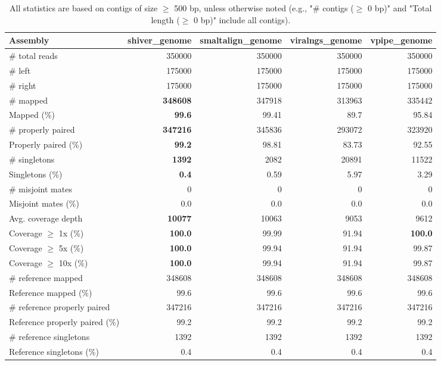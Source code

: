 \documentclass[12pt,a4paper]{article}
\begin{document}
\begin{table}[ht]
\begin{center}
\caption{All statistics are based on contigs of size $\geq$ 500 bp, unless otherwise noted (e.g., "\# contigs ($\geq$ 0 bp)" and "Total length ($\geq$ 0 bp)" include all contigs).}
\begin{tabular}{|l*{4}{|r}|}
\hline
Assembly & shiver\_genome & smaltalign\_genome & viralngs\_genome & vpipe\_genome \\ \hline
\# total reads & 350000 & 350000 & 350000 & 350000 \\ \hline
\# left & 175000 & 175000 & 175000 & 175000 \\ \hline
\# right & 175000 & 175000 & 175000 & 175000 \\ \hline
\# mapped & {\bf 348608} & 347918 & 313963 & 335442 \\ \hline
Mapped (\%) & {\bf 99.6} & 99.41 & 89.7 & 95.84 \\ \hline
\# properly paired & {\bf 347216} & 345836 & 293072 & 323920 \\ \hline
Properly paired (\%) & {\bf 99.2} & 98.81 & 83.73 & 92.55 \\ \hline
\# singletons & {\bf 1392} & 2082 & 20891 & 11522 \\ \hline
Singletons (\%) & {\bf 0.4} & 0.59 & 5.97 & 3.29 \\ \hline
\# misjoint mates & 0 & 0 & 0 & 0 \\ \hline
Misjoint mates (\%) & 0.0 & 0.0 & 0.0 & 0.0 \\ \hline
Avg. coverage depth & {\bf 10077} & 10063 & 9053 & 9612 \\ \hline
Coverage $\geq$ 1x (\%) & {\bf 100.0} & 99.99 & 91.94 & {\bf 100.0} \\ \hline
Coverage $\geq$ 5x (\%) & {\bf 100.0} & 99.94 & 91.94 & 99.87 \\ \hline
Coverage $\geq$ 10x (\%) & {\bf 100.0} & 99.94 & 91.94 & 99.87 \\ \hline
\# reference mapped & 348608 & 348608 & 348608 & 348608 \\ \hline
Reference mapped (\%) & 99.6 & 99.6 & 99.6 & 99.6 \\ \hline
\# reference properly paired & 347216 & 347216 & 347216 & 347216 \\ \hline
Reference properly paired (\%) & 99.2 & 99.2 & 99.2 & 99.2 \\ \hline
\# reference singletons & 1392 & 1392 & 1392 & 1392 \\ \hline
Reference singletons (\%) & 0.4 & 0.4 & 0.4 & 0.4 \\ \hline

\end{tabular}
\end{center}
\end{table}
\end{document}
